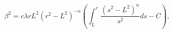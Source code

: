 \begin{equation}
\beta^{2}=c\lambda rL^{2}(r^{2}-L^{2})^{-n}\left(
\int_{L}^{r}\frac{(s^{2}-L^{2})^{n}}{s^{2}}ds - C \right),
\label{beta}
\end{equation}

